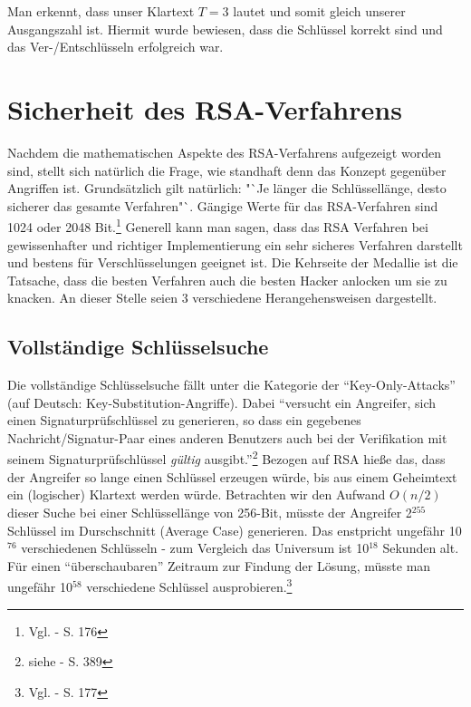 Man erkennt, dass unser Klartext $T = 3$ lautet und somit gleich unserer
Ausgangszahl ist. Hiermit wurde bewiesen, dass die Schlüssel korrekt sind und
das Ver-/Entschlüsseln erfolgreich war.

\section{Sicherheit des RSA-Verfahrens}
Nachdem die mathematischen Aspekte des RSA-Verfahrens aufgezeigt worden sind,
stellt sich natürlich die Frage, wie standhaft denn das Konzept gegenüber
Angriffen ist. Grundsätzlich gilt natürlich: "`Je länger die Schlüssellänge,
desto sicherer das gesamte Verfahren"`. Gängige Werte für das RSA-Verfahren sind
1024 oder 2048 Bit.\footnote{Vgl. \citet{KryptoIX} - S. 176} Generell kann man
sagen, dass das RSA Verfahren bei gewissenhafter und richtiger Implementierung
ein sehr sicheres Verfahren darstellt und bestens für Verschlüsselungen geeignet
ist. Die Kehrseite der Medallie ist die Tatsache, dass die besten Verfahren auch
die besten Hacker anlocken um sie zu knacken. An dieser Stelle seien 3
verschiedene Herangehensweisen dargestellt.
\subsection{Vollständige Schlüsselsuche}
Die vollständige Schlüsselsuche fällt unter die Kategorie der
"`Key-Only-Attacks"' (auf Deutsch: Key-Substitution-Angriffe). Dabei "`versucht
ein Angreifer, sich einen Signaturprüfschlüssel zu generieren, so dass ein
gegebenes Nachricht/Signatur-Paar eines anderen Benutzers auch bei der
Verifikation mit seinem Signaturprüfschlüssel \textit{gültig}
ausgibt."'\footnote{siehe \citet{SpringerKey} - S. 389} Bezogen auf RSA hieße
das, dass der Angreifer so lange einen Schlüssel erzeugen würde, bis aus einem
Geheimtext ein (logischer) Klartext werden würde. Betrachten wir den Aufwand
$O(n/2)$ dieser Suche bei einer Schlüssellänge von 256-Bit, müsste der Angreifer
2$^{255}$ Schlüssel im Durschschnitt (Average Case) generieren. Das
enstpricht ungefähr 10$^{76}$ verschiedenen Schlüsseln - zum Vergleich das
Universum ist 10$^{18}$ Sekunden alt. Für einen "`überschaubaren"' Zeitraum zur
Findung der Lösung, müsste man ungefähr 10$^{58}$ verschiedene Schlüssel
ausprobieren.\footnote{Vgl. \citet{KryptoIX} - S. 177}
